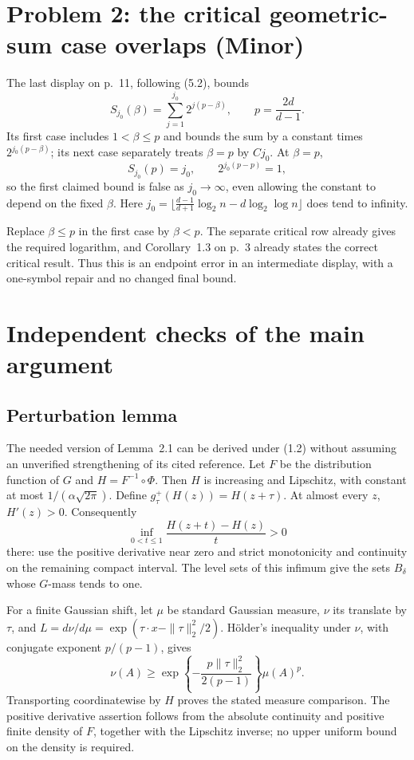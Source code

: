 \documentclass[10pt]{article}
\begin{document}
\section*{Problem 2: the critical geometric-sum case overlaps (Minor)}
The last display on p. 11, following (5.2), bounds \[S_{j_0}(\beta)=\sum_{j=1}^{j_0}2^{j(p-\beta)},
 \qquad p=\frac{2d}{d-1}.\] Its first case includes \(1<\beta\leq p\) and bounds the sum by a constant times \(2^{j_0(p-\beta)}\); its next case separately treats \(\beta=p\) by \(Cj_0\). At \(\beta=p\), \[S_{j_0}(p)=j_0,\qquad 2^{j_0(p-p)}=1,\] so the first claimed bound is false as \(j_0\to\infty\), even allowing the constant to depend on the fixed \(\beta\). Here \(j_0=\lfloor\frac{d-1}{d+1}\log_2n-d\log_2\log n\rfloor\) does tend to infinity.\par
Replace \(\beta\leq p\) in the first case by \(\beta<p\). The separate critical row already gives the required logarithm, and Corollary 1.3 on p. 3 already states the correct critical result. Thus this is an endpoint error in an intermediate display, with a one-symbol repair and no changed final bound.\par
\section*{Independent checks of the main argument}
\subsection*{Perturbation lemma}
The needed version of Lemma 2.1 can be derived under (1.2) without assuming an unverified strengthening of its cited reference. Let \(F\) be the distribution function of \(G\) and \(H=F^{-1}\circ\Phi\). Then \(H\) is increasing and Lipschitz, with constant at most \(1/(\alpha\sqrt{2\pi})\). Define \(g_\tau^+(H(z))=H(z+\tau)\). At almost every \(z\), \(H'(z)>0\). Consequently \[\inf_{0<t\leq1}\frac{H(z+t)-H(z)}t>0\] there: use the positive derivative near zero and strict monotonicity and continuity on the remaining compact interval. The level sets of this infimum give the sets \(B_\delta\) whose \(G\)-mass tends to one.\par
For a finite Gaussian shift, let \(\mu\) be standard Gaussian measure, \(\nu\) its translate by \(\tau\), and \(L=d\nu/d\mu=\exp(\tau\cdot x-\|\tau\|_2^2/2)\). Hölder’s inequality under \(\nu\), with conjugate exponent \(p/(p-1)\), gives \[\nu(A)\geq
 \exp\!\left\{-\frac{p\|\tau\|_2^2}{2(p-1)}\right\}\mu(A)^p.\] Transporting coordinatewise by \(H\) proves the stated measure comparison. The positive derivative assertion follows from the absolute continuity and positive finite density of \(F\), together with the Lipschitz inverse; no upper uniform bound on the density is required.\par
\end{document}
